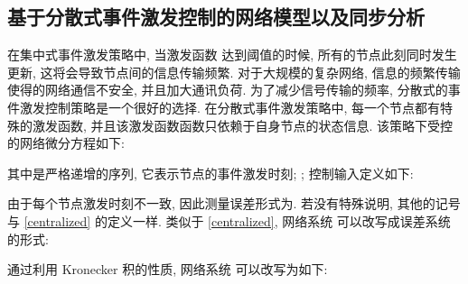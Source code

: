 \subsection{基于分散式事件激发控制的网络模型以及同步分析}\label{decentralized}
        在集中式事件激发策略中, 当激发函数  达到阈值的时候, 所有的节点此刻同时发生更新, 这将会导致节点间的信息传输频繁. 对于大规模的复杂网络, 信息的频繁传输使得的网络通信不安全, 并且加大通讯负荷. 为了减少信号传输的频率, 分散式的事件激发控制策略是一个很好的选择. 在分散式事件激发策略中, 每一个节点都有特殊的激发函数, 并且该激发函数函数只依赖于自身节点的状态信息. 该策略下受控的网络微分方程如下:
        \begin{comment}\label{sys_decen}
        \begin{split} dx_{i}(t)=&\Big[f(x_{i}(t))-\rho(t)\sum^N_{j=1}l_{ij}(r_{t})\Gamma(x_{j}(t^j_{k'})-x_{i}(t^i_{k}))+u_i(t)\Big]dt\\
         &-\rho(t)R_i(t)dw_{i}(t),\quad t^i_{k}\leq t< t^i_{k+1}, \quad i = 1,\cdots,N,
        \end{split}
        \end{comment}
       其中是严格递增的序列, 它表示节点的事件激发时刻; ; 控制输入定义如下:
        \begin{comment}
            u_i(t^i_k)=-\epsilon\rho(t)d_{i}(r_{t})\Gamma[x_{i}(t^i_{k})-s(t^i_{k})].
        \end{comment}

        由于每个节点激发时刻不一致, 因此测量误差形式为. 若没有特殊说明, 其他的记号与 \ref{centralized} 的定义一样. 类似于 \ref{centralized}, 网络系统  可以改写成误差系统的形式:
        \begin{comment}\label{deeit}
            \nonumber d{e}_{i}(t)=&\Big[f(x_{i}(t))-f(s(t))-\rho(t)\sum^N_{j=1}l_{ij}(r_{t})\Gamma(\delta_j(t)+e_j(t))
            -\epsilon\rho(t)d_{i}(r_{t})\Gamma(\delta_i(t)\\
                &+e_i(t)+s(t)-s(t_k))\Big]dt-\rho(t)R_i(t)dw_{i}(t), \quad t^i_{k}\leq t< t^i_{k+1}, \quad i = 1,\cdots,N.
        \end{comment}
        通过利用 Kronecker 积的性质,
        网络系统  可以改写为如下:
        \begin{comment}
        \nonumber de(t)=&\big[f(e(t))-\rho(t)[L(r_t)\otimes\Gamma](\delta(t)+e(t))
        -\epsilon\rho(t)[D(r_t)\otimes\Gamma](\delta(t)+e(t)+\hat{s}(t))\big]dt\\
        &-\rho(t)\Sigma(t)dw(t), \quad t^i_{k}\leq t< t^i_{k+1}, \quad i = 1,\cdots,N,
        \end{comment}

